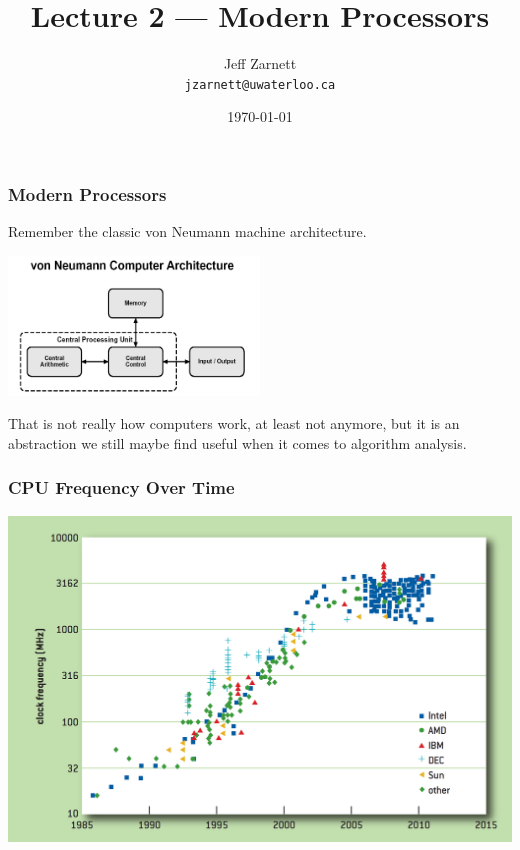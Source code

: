 

\title{Lecture 2 --- Modern Processors }

\author{Jeff Zarnett \\ \small \texttt{jzarnett@uwaterloo.ca}}
\date{\today}




\begin{frame}
  \titlepage

\end{frame}



\begin{frame}
\frametitle{Modern Processors}


Remember the classic von Neumann machine architecture. 

\begin{center}
	\includegraphics[width=0.5\textwidth]{images/vonNeumann.png}
\end{center}

 That is not really how computers work, at least not anymore, but it is an abstraction we still maybe find useful when it comes to algorithm analysis.

\end{frame}



\begin{frame}
\frametitle{CPU Frequency Over Time}


\begin{center}
\includegraphics[width=\textwidth]{images/cpu-frequency}
\end{center}

\end{frame}



